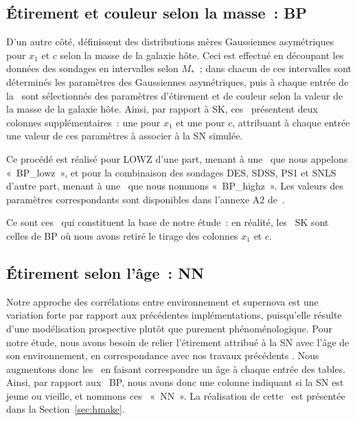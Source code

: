 \documentclass[../main/main.tex]{subfiles}
\begin{document}
\subsection{Étirement et couleur selon la masse~: BP}\label{ssec:bp}

D'un autre côté,  définissent des distributions mères
Gaussiennes asymétriques pour $x_1$ et $c$ selon la masse de la galaxie hôte.
Ceci est effectué en découpant les données des sondages en intervalles selon
$M_*$~; dans chacun de ces intervalles sont déterminés les paramètres des
Gaussiennes asymétriques, puis à chaque entrée de la \hostlib\ sont sélectionnés
des paramètres d'étirement et de couleur selon la valeur de la masse de la
galaxie hôte. Ainsi, par rapport à SK, ces \hostlib\ présentent deux colonnes
supplémentaires~: une pour $x_1$ et une pour $c$, attribuant à chaque entrée une
valeur de ces paramètres à associer à la SN simulée. 

Ce procédé est réalisé pour LOWZ d'une part, menant à une \hostlib\ que nous
appelons «~BP\_lowz~», et pour la combinaison des sondages DES, SDSS, PS1 et
SNLS d'autre part, menant à une \hostlib\ que nous nommons «~BP\_highz~». Les
valeurs des paramètres correspondants sont disponibles dans l'annexe A2
de~.

Ce sont ces \hostlib\ qui constituent la base de notre étude~: en réalité, les
\hostlib\ SK sont celles de BP où nous avons retiré le tirage des colonnes $x_1$
et $c$.

\subsection{Étirement selon l'âge~: NN}\label{ssec:nn}

Notre approche des corrélations entre environnement et supernova est une
variation forte par rapport aux précédentes implémentations, puisqu'elle résulte
d'une modélisation prospective plutôt que purement phénoménologique. Pour notre
étude, nous avons besoin de relier l'étirement attribué à la SN avec l'âge de
son environnement, en correspondance avec nos travaux précédents
\citep[][ci-après NN]{nicolas2021}. Nous
augmentons donc les \hostlib\ en faisant correspondre un âge à chaque entrée des
tables. Ainsi, par rapport aux \hostlib\ BP, nous avons donc une colonne
indiquant si la SN est jeune ou vieille, et nommons ces \hostlib\ «~NN~». La
réalisation de cette \hostlib\ est présentée dans la Section~\ref{sec:hmake}.
\end{document}
